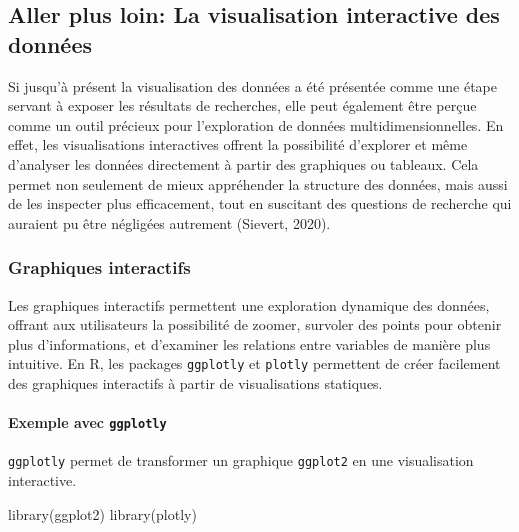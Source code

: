 \documentclass[
  letterpaper,
  DIV=11,
  numbers=noendperiod]{scrreprt}
\let\oldparagraph\paragraph
\renewcommand{\paragraph}[1]{\oldparagraph{#1}\mbox{}}
\newenvironment{Shaded}{\begin{snugshade}}{\end{snugshade}}
\newcommand{\FunctionTok}[1]{\textcolor[rgb]{0.28,0.35,0.67}{#1}}
\newcommand{\NormalTok}[1]{\textcolor[rgb]{0.00,0.23,0.31}{#1}}
\begin{document}
\hypertarget{aller-plus-loin-la-visualisation-interactive-des-donnuxe9es}{%
\subsection{Aller plus loin: La visualisation interactive des
données}\label{aller-plus-loin-la-visualisation-interactive-des-donnuxe9es}}

Si jusqu'à présent la visualisation des données a été présentée comme
une étape servant à exposer les résultats de recherches, elle peut
également être perçue comme un outil précieux pour l'exploration de
données multidimensionnelles. En effet, les visualisations interactives
offrent la possibilité d'explorer et même d'analyser les données
directement à partir des graphiques ou tableaux. Cela permet non
seulement de mieux appréhender la structure des données, mais aussi de
les inspecter plus efficacement, tout en suscitant des questions de
recherche qui auraient pu être négligées autrement (Sievert, 2020).

\hypertarget{graphiques-interactifs}{%
\subsubsection{Graphiques interactifs}\label{graphiques-interactifs}}

Les graphiques interactifs permettent une exploration dynamique des
données, offrant aux utilisateurs la possibilité de zoomer, survoler des
points pour obtenir plus d'informations, et d'examiner les relations
entre variables de manière plus intuitive. En R, les packages
\texttt{ggplotly} et \texttt{plotly} permettent de créer facilement des
graphiques interactifs à partir de visualisations statiques.

\hypertarget{exemple-avec-ggplotly}{%
\paragraph{\texorpdfstring{Exemple avec
\texttt{ggplotly}}{Exemple avec ggplotly}}\label{exemple-avec-ggplotly}}

\texttt{ggplotly} permet de transformer un graphique \texttt{ggplot2} en
une visualisation interactive.

\begin{Shaded}
\begin{Highlighting}[]
\FunctionTok{library}\NormalTok{(ggplot2)}
\FunctionTok{library}\NormalTok{(plotly)}
\end{Highlighting}
\end{Shaded}
\end{document}
